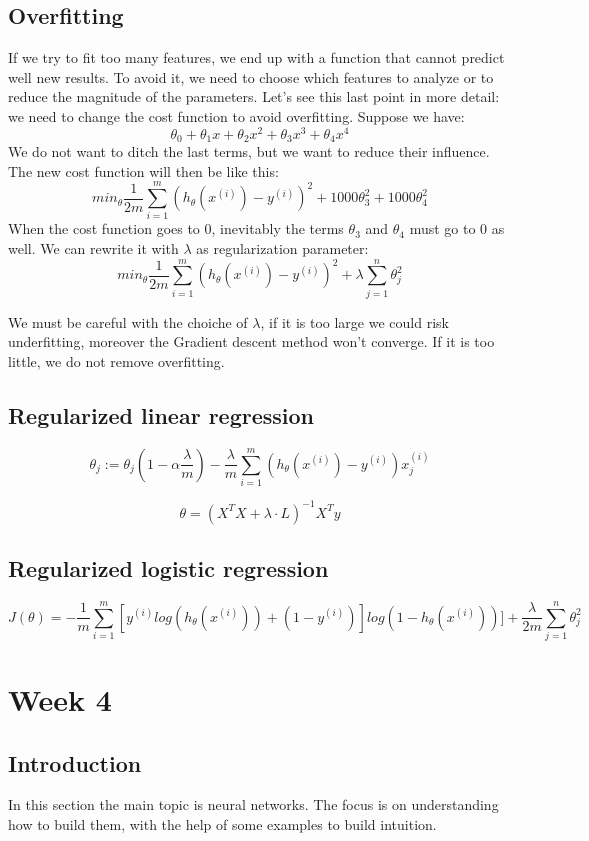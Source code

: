 \documentclass{article}
\begin{document}
\subsection{Overfitting}
If we try to fit too many features, we end up with a function that cannot predict
well new results. To avoid it, we need to choose which features to analyze or to
reduce the magnitude of the parameters.
Let's see this last point in more detail: we need to change the cost function to
avoid overfitting.
Suppose we have:
$$ \theta_0 + \theta_1x + \theta_2x^2  + \theta_3x^3 + \theta_4x^4 $$
We do not want to ditch the last terms, but we want to reduce their influence.
The new cost function will then be like this:
$$ min_{\theta}\frac{1}{2m}\sum_{i=1}^{m}(h_\theta(x^{(i)})-y^{(i)})^2 +
1000 \theta_3^2 + 1000 \theta_4^2 $$
When the cost function goes to 0, inevitably the terms $\theta_3$ and $\theta_4$
must go to 0 as well.
We can rewrite it with $\lambda$ as regularization parameter:
$$ min_{\theta}\frac{1}{2m}\sum_{i=1}^{m}(h_\theta(x^{(i)})-y^{(i)})^2 + \lambda
\sum_{j=1}^n\theta_j^2$$

We must be careful with the choiche of $\lambda$, if it is too large we could
risk underfitting, moreover the Gradient descent method won't converge.
If it is too little, we do not remove overfitting.

\subsection{Regularized linear regression}

$$\theta_j := \theta_j(1-\alpha\frac{\lambda}{m})-
\frac{\lambda}{m}\sum_{i=1}^m(h_\theta(x^{(i)}) - y^{(i)})x_j^{(i)} $$

$$ \theta = (X^T X + \lambda \cdot L)^{-1} X^T y $$

\subsection{Regularized logistic regression}

$$ J(\theta) = -\frac{1}{m}\sum_{i=1}^m[y^{(i)}log(h_\theta(x^{(i)})) +
(1-y^{(i)})]log(1-h_\theta(x^{(i)}))] + \frac{\lambda}{2m}\sum_{j=1}^n\theta_j^2$$


\section{Week 4}
\subsection{Introduction}
In this section the main topic is neural networks. The focus is on understanding
how to build them, with the help of some examples to build intuition.
\end{document}
